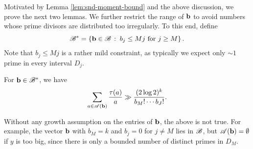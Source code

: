 Motivated by Lemma \ref{lem:snd-moment-bound} and the above discussion, we prove the next two lemmas.
We further restrict the range of $\mathbf{b}$ to avoid numbers whose prime divisors are distributed too irregularly. 
To this end, define
\begin{equation*}
    \mathscr{B}^* = \left\{\mathbf{b} \in \mathscr{B}\,:\;b_j \le Mj \text{ for } j \ge M\right\}.
\end{equation*}
Note that $b_j \le Mj$ is a rather mild constraint, as typically we expect only $\sim 1$ prime in every interval $D_j$.

\begin{lemma} \label{lem:lower-bound-for-sum-over-tau-a}
    For $\mathbf{b} \in \mathscr{B}^*$, we have
    \begin{equation*}
        \sum \limits_{a \in \mathscr{A}(\mathbf{b})} \frac{\tau (a)}{a} \gg \frac{(2 \log2 )^k}{b_M! \cdots b_J!}.
    \end{equation*}
\end{lemma}

\begin{remark}
    Without any growth assumption on the entries of $\mathbf{b}$, the above is not true. 
    For example, the vector $\mathbf{b}$ with $b_M = k$ and $b_j = 0$ for $j \ne M$ lies in $\mathscr{B}$, but $\mathscr{A}(\mathbf{b}) = \emptyset$ if $y$ is too big, since there is only a bounded number of distinct primes in $D_M$.
\end{remark}


